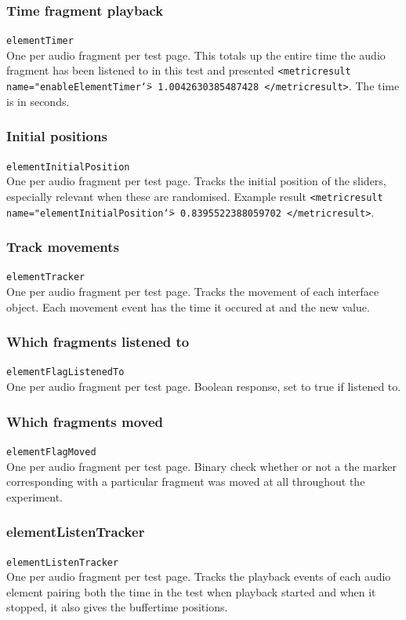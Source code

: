 \documentclass[11pt, oneside]{article}   	%
\begin{document}
		\subsubsection{Time fragment playback}
			\texttt{elementTimer}\\
			One per audio fragment per test page. This totals up the entire time the audio fragment has been listened to in this test and presented \texttt{<metricresult name="enableElementTimer\texttt{\char`\"}> 1.0042630385487428 </metricresult>}. The time is in seconds.

		\subsubsection{Initial positions}
			\texttt{elementInitialPosition}\\
			One per audio fragment per test page. Tracks the initial position of the sliders, especially relevant when these are randomised. Example result \texttt{<metricresult name="elementInitialPosition\texttt{\char`\"}> 0.8395522388059702 </metricresult>}.

		\subsubsection{Track movements}
		    \texttt{elementTracker}\\
		    One per audio fragment per test page. Tracks the movement of each interface object. Each movement event has the time it occured at and the new value.
		\subsubsection{Which fragments listened to}
		    \texttt{elementFlagListenedTo}\\
		    One per audio fragment per test page. Boolean response, set to true if listened to.
		\subsubsection{Which fragments moved}
		    \texttt{elementFlagMoved}\\
			One per audio fragment per test page. Binary check whether or not a the marker corresponding with a particular fragment was moved at all throughout the experiment. 

		\subsubsection{elementListenTracker}
		    \texttt{elementListenTracker}\\
		    One per audio fragment per test page. Tracks the playback events of each audio element pairing both the time in the test when playback started and when it stopped, it also gives the buffertime positions.
\end{document}
